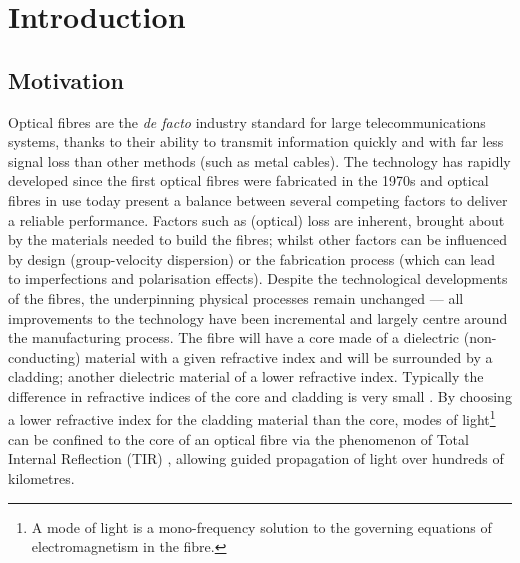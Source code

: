 \chapter{Introduction} \label{ch:1Intro}

\section{Motivation}
Optical fibres are the \textit{de facto} industry standard for large telecommunications systems, thanks to their ability to transmit information quickly and with far less signal loss than other methods (such as metal cables).
The technology has rapidly developed since the first optical fibres were fabricated in the 1970s \cite{knight2003photonic} and optical fibres in use today present a balance between several competing factors to deliver a reliable performance.
Factors such as (optical) loss are inherent, brought about by the materials needed to build the fibres; whilst other factors can be influenced by design (group-velocity dispersion) or the fabrication process (which can lead to imperfections and polarisation effects).
Despite the technological developments of the fibres, the underpinning physical processes remain unchanged --- all improvements to the technology have been incremental and largely centre around the manufacturing process.
The fibre will have a core made of a dielectric (non-conducting) material with a given refractive index and will be surrounded by a cladding; another dielectric material of a lower refractive index.
Typically the difference in refractive indices of the core and cladding is very small . 
By choosing a lower refractive index for the cladding material than the core, modes of light\footnote{A mode of light is a mono-frequency solution to the governing equations of electromagnetism in the fibre.} can be confined to the core of an optical fibre via the phenomenon of Total Internal Reflection (TIR) , allowing guided propagation of light over  hundreds of kilometres.\newline

